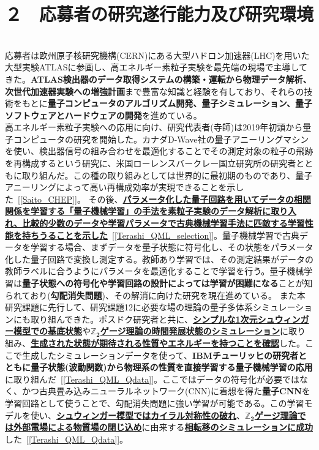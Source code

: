 \documentclass[11pt,a4j,dvipdfmx]{jarticle} 					%
\newcommand{\研究課題名}{誤り耐性量子コンピュータに向けた誤り訂正技術の開発(仮)}
\newcommand{\研究機関名}{東京大学}
\newcommand{\研究代表者氏名}{寺師弘二}
\newcommand{\研究期間の最終元号年度}{10}  %
\newcommand{\mybf}[1]{{\bfseries\sffamily#1}}
\newcommand{\maruone}{\raise0.2mm\hbox{\textcircled{\scriptsize{1}}}}
\newcommand{\marutwo}{\raise0.2mm\hbox{\textcircled{\scriptsize{2}}}}
\begin{document}

\section{２　応募者の研究遂行能力及び研究環境}

\\
応募者は欧州原子核研究機構(CERN)にある大型ハドロン加速器(LHC)を用いた大型実験ATLASに参画し、高エネルギー素粒子実験を最先端の現場で主導してきた。\mybf{ATLAS検出器のデータ取得システムの構築・運転から物理データ解析、次世代加速器実験への増強計画}まで豊富な知識と経験を有しており、それらの技術をもとに\mybf{量子コンピュータのアルゴリズム開発、量子シミュレーション、量子ソフトウェアとハードウェアの開発}を進めている。\vspace{-2mm}\\

高エネルギー素粒子実験への応用に向け、研究代表者(寺師)は2019年初頭から量子コンピュータの研究を開始した。カナダD-Wave社の量子アニーリングマシンを使い、検出器信号の組み合わせを最適化することでその測定対象の粒子の飛跡を再構成するという研究に、米国ローレンスバークレー国立研究所の研究者とともに取り組んだ。この種の取り組みとしては世界的に最初期のものであり、量子アニーリングによって高い再構成効率が実現できることを示した~[\ref{Saito_CHEP}]。
その後、\mybf{\ul{パラメータ化した量子回路を用いてデータの相関関係を学習する「量子機械学習」の手法を素粒子実験のデータ解析に取り入れ、比較的少数のデータや学習パラメータで古典機械学習手法に匹敵する学習性能を持ちうることを示した}}~[\ref{Terashi_QML_selection}]。量子機械学習で古典データを学習する場合、まずデータを量子状態に符号化し、その状態をパラメータ化した量子回路で変換し測定する。教師あり学習では、その測定結果がデータの教師ラベルに合うようにパラメータを最適化することで学習を行う。量子機械学習は\mybf{量子状態への符号化や学習回路の設計によっては学習が困難になる}ことが知られており(\mybf{勾配消失問題})、その解消に向けた研究を現在進めている。
また本研究課題に先行して、研究課題{\maruone}{\marutwo}に必要な場の理論の量子多体系シミュレーションにも取り組んできた。ポスドク研究者と共に、\mybf{\ul{シンプルな1次元シュウィンガー模型での基底状態}}や\underline{\mybf{$\pmb{\mathbb{Z}_2}$ゲージ理論の時間発展状態のシミュレーション}}に取り組み、\mybf{\ul{生成された状態が期待される性質やエネルギーを持つことを確認}}した。ここで生成したシミュレーションデータを使って、\mybf{IBMチューリッヒの研究者とともに量子状態(波動関数)から物理系の性質を直接学習する量子機械学習の応用}に取り組んだ~[\ref{Terashi_QML_Qdata}]。ここではデータの符号化が必要ではなく、かつ古典畳み込みニューラルネットワーク(CNN)に着想を得た\mybf{量子CNN}を学習回路として使うことで、勾配消失問題に強い学習が可能である。この学習モデルを使い、\mybf{\ul{シュウィンガー模型ではカイラル対称性の破れ}}、\underline{\mybf{$\pmb{\mathbb{Z}_2}$ゲージ理論では外部電場による物質場の閉じ込め}}に由来する\mybf{\ul{相転移のシミュレーションに成功}}した~[\ref{Terashi_QML_Qdata}]。
\end{document}
